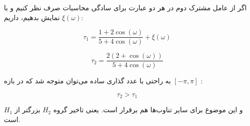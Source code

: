\documentclass[12pt]{article}
\begin{document}
\begin{enumerate}
	اگر از عامل مشترک دوم در هر دو عبارت برای سادگی محاسبات صرف نظر کنیم و با $\xi(\omega)$ نمایش بدهیم، داریم:
	
	$$\tau_1 =\frac{1+ 2 \cos (\omega)}{5 + 4 \cos (\omega)} + \xi(\omega)$$
	
	$$\tau_2 = \frac{2(2 + \cos (\omega))}{5 + 4 \cos (\omega)}$$
		
		به راحتی با عدد گذاری ساده می‌توان متوجه شد که در بازه
		 $[-\pi,\pi]$
		 :
		 
		$$\tau_2 > \tau_1$$
		
		و این موضوع برای سایر تناوب‌ها هم برقرار است.
		یعنی تاخیر گروه $H_2$ بزرگتر از $H_1$ است.
		
		
\end{enumerate}
\end{document}
